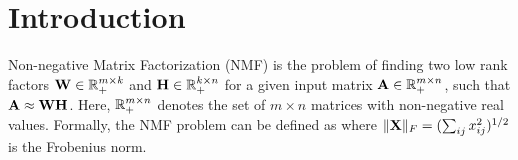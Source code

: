 

\section{Introduction}


Non-negative Matrix Factorization (NMF) is the problem of finding two low rank factors $\mathbf{W}\in \mathbb{R}_+^{m\times k}$ and $\mathbf{H}\in \mathbb{R}_+^{k \times n}$ for a given input matrix  $\mathbf{A}\in \mathbb{R}_+^{m\times n}$, such that $\mathbf{A} \approx \mathbf{W} \mathbf{H}$.
Here, $\mathbb{R}_+^{m\times n}$ denotes the set of $m \times n$ matrices with non-negative real values.
Formally, the NMF problem can be defined as 
where $\|{\mathbf{X}}\|_F=(\sum_{ij} x_{ij}^2)^{1/2}$ is the Frobenius norm. 

